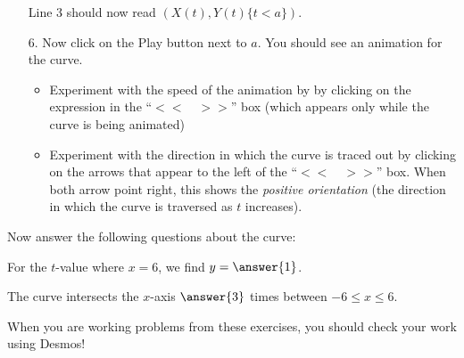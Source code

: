 \documentclass{ximera}
\begin{document}
\begin{exercise}
\begin{itemize}
Line 3 should now read $(X(t),Y(t)\{t<a\} )$.

\item[6.] Now click on the Play button next to $a$.  You should see an animation for the curve.  
\begin{itemize}
\item Experiment with the speed of the animation by by clicking on the expression in the ``$<< \quad >>$'' box (which appears only while the curve is being animated)
\item Experiment with the direction in which the curve is traced out by clicking on the arrows that appear to the left of the ``$<< \quad >>$'' box.  When both arrow point right, this shows the \emph{positive orientation} (the direction in which the curve is traversed as $t$ increases).
\end{itemize}
\end{itemize}
Now answer the following questions about the curve:

For the $t$-value where $x=6$, we find $y=\answer{1}$.

The curve intersects the $x$-axis $\answer{3}$ times between $-6 \leq x \leq 6$.

\begin{remark}
When you are working problems from these exercises, you should check your work using Desmos!
\end{remark}

\end{exercise}
\end{document}
